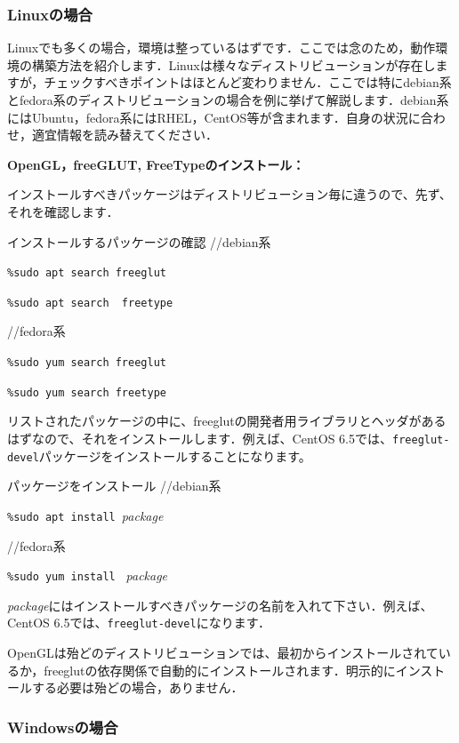 \documentclass[a4paper,12pt]{jsarticle}%
\begin{document}
\subsubsection{Linuxの場合}

Linuxでも多くの場合，環境は整っているはずです．ここでは念のため，動作環境の構築方法を紹介します．Linuxは様々なディストリビューションが存在しますが，チェックすべきポイントはほとんど変わりません．ここでは特にdebian系とfedora系のディストリビューションの場合を例に挙げて解説します．debian系にはUbuntu，fedora系にはRHEL，CentOS等が含まれます．自身の状況に合わせ，適宜情報を読み替えてください．

{\bf OpenGL，freeGLUT, FreeTypeのインストール：}

インストールすべきパッケージはディストリビューション毎に違うので、先ず、それを確認します．

\begin{itembox}[l]{インストールするパッケージの確認}
	//debian系

	\verb|%sudo apt search freeglut|
	
	\verb|%sudo apt search  freetype|

	//fedora系

	\verb|%sudo yum search freeglut|
	
	\verb|%sudo yum search freetype|
	
\end{itembox}

リストされたパッケージの中に、freeglutの開発者用ライブラリとヘッダがあるはずなので、それをインストールします．例えば、CentOS 6.5では、\verb|freeglut-devel|パッケージをインストールすることになります。

\begin{itembox}[l]{パッケージをインストール}
	//debian系

	\verb|%sudo apt install |{\it package}

	//fedora系

	\verb|%sudo yum install | {\it package}
\end{itembox}

{\it package}にはインストールすべきパッケージの名前を入れて下さい．例えば、CentOS 6.5では、\verb|freeglut-devel|になります．

OpenGLは殆どのディストリビューションでは、最初からインストールされているか，freeglutの依存関係で自動的にインストールされます．明示的にインストールする必要は殆どの場合，ありません．

\subsubsection{Windowsの場合}
\end{document}
